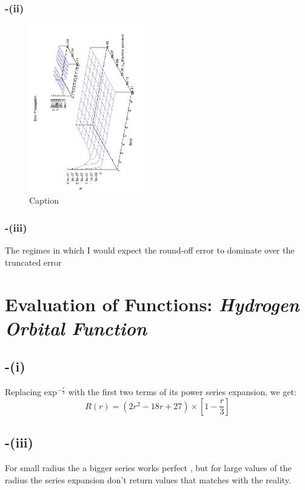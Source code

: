 \documentclass[twocolumn]{article}
\begin{document}
\subsubsection*{-(ii)}
\begin{figure}[H]
\begin{center}
\includegraphics[width=2.0in, angle=270]{Error_propagation.pdf}
\caption{Caption}
\label{Error Propagation}
\end{center}
\end{figure}

\subsubsection*{-(iii)}
The regimes in which I would expect the round-off error to dominate over the truncated error


\section{Evaluation of Functions: \textit{Hydrogen Orbital Function}}
\subsection*{-(i)}
Replacing exp$^{-\frac{r}{3}}$ with the first two terms of its power series expansion, we get:
\begin{equation}
R(r) = (2r^2 - 18r +27) \times \left[1 - \frac{r}{3}\right]
\end{equation}
\subsection{-(iii)}
For small radius the a bigger series works perfect , but for large values of the radius the series expansion don't return values that matches with the reality. 
\end{document}
